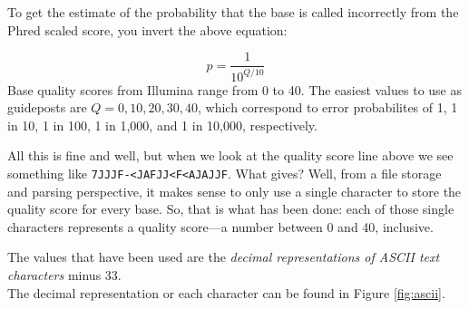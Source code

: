 \documentclass[]{krantz}
\begin{document}
To get the estimate of the probability that the base is called incorrectly from
the Phred scaled score, you invert the above equation:

\[
p = \frac{1}{10^{Q/10}}
\]
Base quality scores from Illumina range from 0 to 40.
The easiest values to use as guideposts are \(Q = 0, 10, 20, 30, 40\), which correspond to
error probabilites of 1, 1 in 10, 1 in 100, 1 in 1,000, and 1 in 10,000, respectively.

All this is fine and well, but when we look at the quality score line above we see
something like \texttt{7JJJF-\textless{}JAFJJ\textless{}F\textless{}AJAJJF}. What gives? Well, from a file storage and
parsing perspective, it makes sense to only use a single character to store the
quality score for every base. So, that is what has been done: each of those
single characters represents a quality score---a number between 0 and 40, inclusive.

The values that have been used are the \emph{decimal representations of ASCII text characters} minus 33.\\
The decimal representation or each character can be found in Figure \ref{fig:ascii}.
\end{document}
